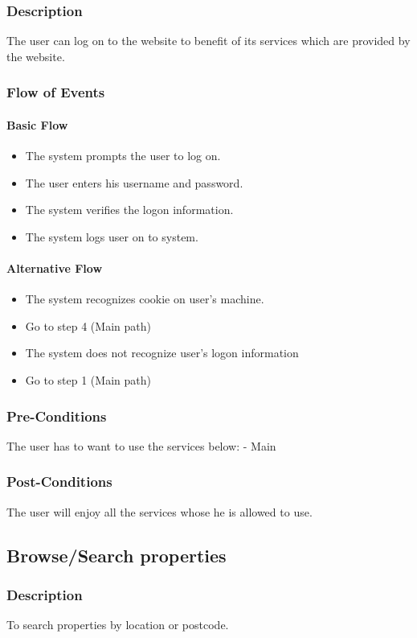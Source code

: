 \documentclass[a4paper,12pt]{article}
\begin{document}
\subsubsection{Description}
The user can log on to the website to benefit of its services which are provided by the website.
\subsubsection{Flow of Events}
\paragraph{Basic Flow}
\begin{itemize}
\item The system prompts the user to log on.
\item The user enters his username and password. 
\item The system verifies the logon information. 
\item The system logs user on to system.
\end{itemize}

\paragraph{Alternative Flow}
\begin{itemize}
\item The system recognizes cookie on user's machine. 
\item Go to step 4 (Main path)
\item The system does not recognize user's logon information 
\item Go to step 1 (Main path)
\end{itemize}

\subsubsection{Pre-Conditions}
The user has to want to use the services below:
- Main 
\subsubsection{Post-Conditions}
The user will enjoy all the services whose he is allowed to use.


\subsection{Browse/Search properties}
\subsubsection{Description}
To search properties by location or postcode.
\end{document}
